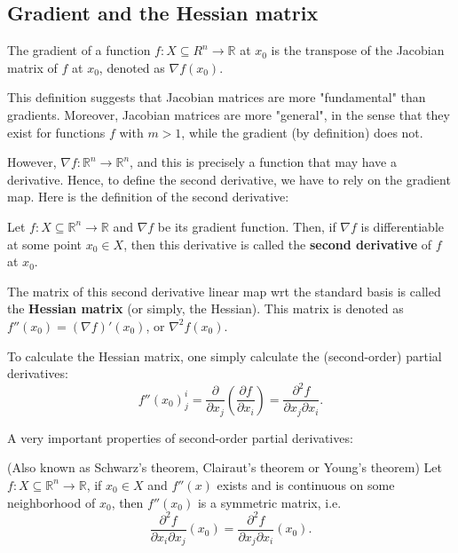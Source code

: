 \subsection{Gradient and the Hessian matrix} %
\label{sub:Gradient and the Hessian matrix}

\begin{definition}[Gradient]
\label{def:Gradient}
  The gradient of a function \( f: X \subseteq R^{n} \to  \mathbb{R} \) at
  \( x_{0} \) is the transpose of the Jacobian matrix of \( f \) at \( x_{0} \),
  denoted as \( \nabla f(x_{0}) \).
\end{definition}

This definition suggests that Jacobian matrices are more "fundamental" than
gradients. Moreover, Jacobian matrices are more "general", in the sense that
they exist for functions \( f \) with \( m > 1 \), while the gradient (by
definition) does not.

However, \( \nabla f: \mathbb{R}^{n} \to  \mathbb{R}^{n} \), and this is
precisely a function that may have a derivative. Hence, to define the second
derivative, we have to rely on the gradient map. Here is the definition of the
second derivative:

\begin{definition}
\label{def:Second derivative and the Hessian matrix}
  Let \( f: X \subseteq \mathbb{R}^{n} \to \mathbb{R} \) and \( \nabla f \) be
  its gradient function. Then, if \( \nabla f \) is differentiable at some point
  \( x_{0} \in X \), then this derivative is called the \textbf{second
  derivative} of \( f \) at \( x_{0} \).

  The matrix of this second derivative linear map wrt the standard basis is
  called the \textbf{Hessian matrix} (or simply, the Hessian). This matrix is
  denoted as \( f''(x_{0}) = (\nabla f)'(x_{0}) \), or \( \nabla ^2f(x_{0}) \).
\end{definition}

To calculate the Hessian matrix, one simply calculate the (second-order) partial
derivatives:
\[
  f''(x_{0})^{i}_{j} = \frac{\partial}{\partial x_{j}} \left(
  \frac{\partial f}{\partial x_{i}} \right) = \frac{\partial ^2 f}{\partial
x_{j}\partial x_{i}}
.\] 

A very important properties of second-order partial derivatives:

\begin{theorem}
\label{thr:Symmetry of Second Derivatives}
  (Also known as Schwarz's theorem, Clairaut's theorem or Young's theorem) Let
  \( f: X \subseteq \mathbb{R}^{n} \to  \mathbb{R} \), if \( x_{0} \in X \) and
  \( f''(x) \) exists and is continuous on some neighborhood of \( x_{0} \),
  then \( f''(x_{0}) \) is a symmetric matrix, i.e.
  \[
    \frac{\partial ^2 f}{\partial x_{i} \partial x_{j}}(x_{0})=
    \frac{\partial ^2 f}{\partial x_{j} \partial x_{i}}(x_{0})
  .\] 
\end{theorem}

